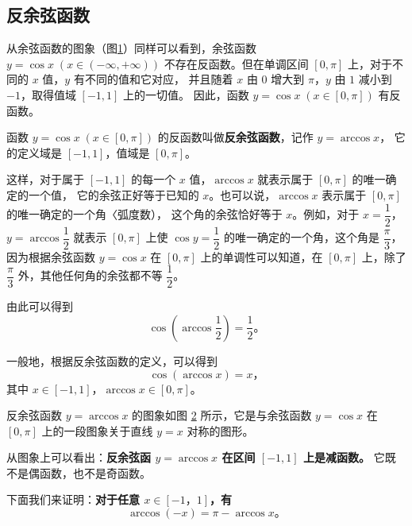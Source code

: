 \subsection{反余弦函数}\label{subsec:1-2}

从余弦函数的图象（图\ref{fig:1-4}）同样可以看到，余弦函数 $y = \cos x \; (x \in (-\infty, +\infty))$
不存在反函数。但在单调区间 $[0, \pi]$ 上，对于不同的 $x$ 值，$y$ 有不同的值和它对应，
并且随着 $x$ 由 $0$ 增大到 $\pi$，$y$ 由 $1$ 减小到 $-1$，取得值域 $[-1, 1]$ 上的一切值。
因此，函数 $y = \cos x \; (x \in [0, \pi])$ 有反函数。

\begin{figure}[htbp]
    \centering
    
    \caption{}\label{fig:1-4}
\end{figure}

函数 $y = \cos x \; (x \in [0, \pi])$ 的反函数叫做\textbf{反余弦函数}，记作 $y = \arccos x$，
它的定义域是 $[-1, 1]$，值域是 $[0, \pi]$。

这样，对于属于 $[-1, 1]$ 的每一个 $x$ 值，$\arccos x$ 就表示属于 $[0, \pi]$ 的唯一确定的一个值，
它的余弦正好等于已知的 $x$。也可以说，$\arccos x$ 表示属于 $[0, \pi]$ 的唯一确定的一个角〈弧度数），\jiange
这个角的余弦恰好等于 $x$。例如，对于 $x = \dfrac{1}{2}$，$y = \arccos \dfrac{1}{2}$\jiange
就表示 $[0, \pi]$ 上使 $\cos y = \dfrac{1}{2}$ 的唯一确定的一个角，这个角是 $\dfrac{\pi}{3}$，\jiange
因为根据余弦函数 $y = \cos x$ 在 $[0, \pi]$ 上的单调性可以知道，在 $[0, \pi]$ 上，除了
$\dfrac{\pi}{3}$ 外，其他任何角的余弦都不等 $\dfrac{1}{2}$。\jiange

由此可以得到
$$\cos\left( \arccos \dfrac{1}{2} \right) = \dfrac{1}{2} \text{。}$$

一般地，根据反余弦函数的定义，可以得到
$$ \cos(\arccos x) = x \text{，}$$
其中 $x \in [-1, 1]$，$\arccos x \in [0, \pi]$。

反余弦函数 $y = \arccos x$ 的图象如图 \ref{fig:1-5} 所示，它是与余弦函数 $y = \cos x$
在 $[0, \pi]$ 上的一段图象关于直线 $y = x$ 对称的图形。

\begin{figure}[htbp]
    \centering
    
    \caption{}\label{fig:1-5}
\end{figure}

从图象上可以看出：\textbf{反余弦函 $y = \arccos x$ 在区间 $[-1, 1]$ 上是减函数。}
它既不是偶函数，也不是奇函数。

下面我们来证明：\textbf{对于任意 $x \in [-1，1]$，有}
$$ \arccos (-x) = \pi - \arccos x \text{。}$$


